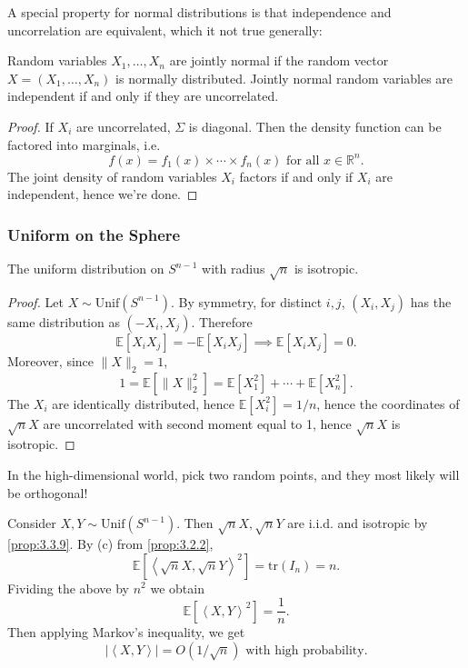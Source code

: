 A special property for normal distributions is that independence and uncorrelation are equivalent, which 
it not true generally: 
\begin{corollary}[Name]
\label{cor:3.3.8}
Random variables $X_1, \dots, X_n$ are jointly normal if the random vector $X = (X_1, \dots, X_n)$ is 
normally distributed. Jointly normal random variables are independent if and only if they are uncorrelated.
\end{corollary}

\begin{proof}
If $X_i$ are uncorrelated, $\Sigma$ is diagonal. Then the density function can be factored into marginals, 
i.e. 
\[ f(x) = f_1(x) \times \cdots \times f_n(x) \text{ for all } x \in \mathbb{R}^n. \]
The joint density of random variables $X_i$ factors if and only if $X_i$ are independent, hence we're done.
\end{proof}


\subsubsection{Uniform on the Sphere}
\begin{proposition}
\label{prop:3.3.9}
The uniform distribution on $S^{n - 1}$ with radius $\sqrt{n}$ is isotropic.
\end{proposition}

\begin{proof}
Let $X \sim \mathrm{Unif}(S^{n - 1})$. By symmetry, for distinct $i, j$, $(X_i, X_j)$ has the same distribution 
as $(-X_i, X_j)$. Therefore 
\[ \mathbb{E}[X_i X_j] = -\mathbb{E}[X_i X_j] \implies \mathbb{E}[X_i X_j] = 0. \]
Moreover, since $\lVert X \rVert_{2} = 1$, 
\[ 1 = \mathbb{E}[\lVert X \rVert_{2}^2] = \mathbb{E}[X_1^2] + \cdots + \mathbb{E}[X_n^2]. \]
The $X_i$ are identically distributed, hence $\mathbb{E}[X_i^2] = 1/n$, hence the coordinates of $\sqrt{n}X$ 
are uncorrelated with second moment equal to 1, hence $\sqrt{n}X$ is isotropic.
\end{proof}

\begin{note}
In the high-dimensional world, pick two random points, and they most likely will be orthogonal!

Consider $X, Y \sim \text{Unif}(S^{n - 1})$. Then $\sqrt{n}X, \sqrt{n}Y$ are i.i.d. and isotropic by 
\cref{prop:3.3.9}. By (c) from \cref{prop:3.2.2}, 
\[ \mathbb{E}[\left\langle \sqrt{n}X, \sqrt{n}Y \right\rangle^2] = \mathrm{tr}(I_n) = n. \]
Fividing the above by $n^2$ we obtain 
\[ \mathbb{E}[\left\langle X, Y \right\rangle^2] = \frac{1}{n}. \]
Then applying Markov's inequality, we get 
\[ |\left\langle X, Y \right\rangle| = O(1/ \sqrt{n}) \text{ with high probability}. \]
\end{note}

